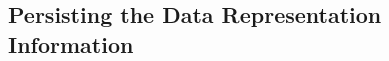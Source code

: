 






\subsection{Persisting the Data Representation Information}
\label{sec:ildl:signatures}









